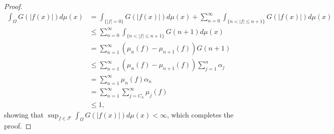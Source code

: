 \documentclass{article}
\theoremstyle{definition}
\begin{document}
\begin{proof}
\begin{align*}
\int_\Omega G(|f(x)|) d\mu(x)&=\int_{\{|f|=0\}} G(|f(x)|) d\mu(x)+ \sum_{n=0}^\infty \int_{\{n < |f| \leq n+1\}}
G(|f(x)|) d\mu(x)\\
&\leq  \sum_{n=0}^\infty \int_{\{n<|f| \leq n+1\}} G(n+1) d\mu(x)\\
&= \sum_{n=1}^\infty (\mu_n(f)-\mu_{n+1}(f)) G(n+1)\\
&\leq \sum_{n=1}^\infty (\mu_n(f)-\mu_{n+1}(f)) \sum_{j=1}^n \alpha_j\\
&=\sum_{n=1}^\infty \mu_n(f) \alpha_n\\
&=\sum_{n=1}^\infty \sum_{j=C_n}^\infty \mu_j(f)\\
&\leq 1,
\end{align*}
showing that $\sup_{f \in \mathscr{F}} \int_\Omega G(|f(x)|) d\mu(x)<\infty$, which completes the proof.
\end{proof}
\end{document}
